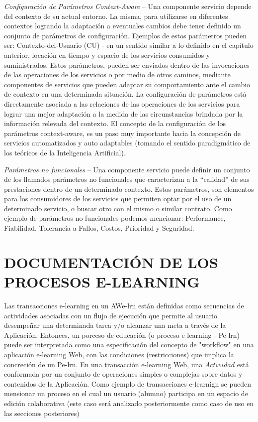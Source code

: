 \documentclass[12 pt,a4paper]{llncs}
\begin{document}
\textit{Configuración de Parámetros Context-Aware} – Una componente servicio depende del contexto de su actual entorno. La misma, para utilizarse en diferentes contextos logrando la adaptación a eventuales cambios debe tener definido un conjunto de parámetros de configuración.  Ejemplos de estos parámetros pueden ser: Contexto-del-Usuario (CU) - en un sentido similar a lo definido en el capítulo anterior, locación en tiempo y espacio de los servicios consumidos y suministrados. Estos parámetros, pueden ser enviados dentro de las invocaciones de las operaciones de los servicios o por medio de otros caminos, mediante componentes de servicios que pueden adaptar su comportamiento ante el cambio de contexto en una determinada situación.  
La configuración de parámetros está directamente asociada a las relaciones de las operaciones de los servicios para lograr una mejor adaptación a la medida de las circunstancias brindada por la información relevada del contexto. El concepto de la configuración de los parámetros context-aware, es un paso muy importante hacia la concepción de servicios automatizados y auto adaptables (tomando el sentido paradigmático de los teóricos de la Inteligencia Artificial).

\textit{Parámetros no funcionales} – Una componente servicio puede definir un conjunto de  los llamados parámetros no funcionales que caracterizan a la “calidad” de sus prestaciones dentro de un determinado contexto. Estos parámetros, son elementos para los consumidores de los servicios que permiten optar por el uso de un determinado  servicio, o buscar otro con el mismo o similar contrato. Como ejemplo de parámetros no funcionales podemos mencionar: Performance, Fiabilidad, Tolerancia a Fallos, Costos, Prioridad y Seguridad.


\section{DOCUMENTACIÓN DE LOS PROCESOS E-LEARNING} \label{documentacion}

Las transacciones e-learning en un AWe-lrn están definidas como secuencias de actividades asociadas con un flujo de ejecución que permite al usuario desempeñar una determinada tarea  y/o alcanzar una meta a través de la Aplicación. Entonces, un porceso de educación (o proceso e-learning - Pe-lrn) puede ser interpretada como una especificación del concepto de "workflow" en una aplicación e-learning Web, con las condiciones (restricciones) que implica la concreción de un Pe-lrn. En una transacción e-learning Web, una  $Actividad$ está  conformada por un conjunto de operaciones simples o complejas sobre datos y contenidos de la Aplicación. Como ejemplo de transacciones e-learnign se pueden mensionar un proceso en el cual un usuario (alumno) participa en un espacio de edición colaborativa (este caso será analizado posteriormente como caso de uso en las secciones posteriores) 
\end{document}
